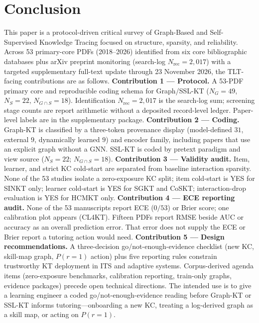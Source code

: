 \documentclass[lettersize,journal]{IEEEtran}
\begin{document}
\section{Conclusion}
\label{sec:conclusion}
This paper is a protocol-driven critical survey of Graph-Based and Self-Supervised Knowledge Tracing focused on structure, sparsity, and reliability. Across 53 primary-core PDFs (2018--2026) identified from six core bibliographic databases plus arXiv preprint monitoring (search-log $N_{\mathrm{rec}} = 2{,}017$) with a targeted supplementary full-text update through 23 November 2026, the TLT-facing contributions are as follows.
\textbf{Contribution 1 --- Protocol.} A 53-PDF primary core and reproducible coding schema for Graph/SSL-KT ($N_G=49$, $N_S=22$, $N_{G \cap S}=18$). Identification $N_{\mathrm{rec}}=2{,}017$ is the search-log sum; screening stage counts are report arithmetic without a deposited record-level ledger. Paper-level labels are in the supplementary package.
\textbf{Contribution 2 --- Coding.} Graph-KT is classified by a three-token provenance display (model-defined $31$, external $9$, dynamically learned $9$) and encoder family, including papers that use an explicit graph without a GNN. SSL-KT is coded by pretext paradigm and view source ($N_S=22$; $N_{G\cap S}=18$).
\textbf{Contribution 3 --- Validity audit.} Item, learner, and strict KC cold-start are separated from baseline interaction sparsity. None of the 53 studies isolate a zero-exposure KC split; item cold-start is YES for SINKT only; learner cold-start is YES for SGKT and CoSKT; interaction-drop evaluation is YES for HCMKT only.
\textbf{Contribution 4 --- ECE reporting audit.} None of the 53 manuscripts report ECE ($0/53$) or Brier score; one calibration plot appears (CL4KT). Fifteen PDFs report RMSE beside AUC or accuracy as an overall prediction error. That error does not supply the ECE or Brier report a tutoring action would need.
\textbf{Contribution 5 --- Design recommendations.} A three-decision go/not-enough-evidence checklist (new KC, skill-map graph, $P(r=1)$ action) plus five reporting rules constrain trustworthy KT deployment in ITS and adaptive systems. Corpus-derived agenda items (zero-exposure benchmarks, calibration reporting, train-only graphs, evidence packages) precede open technical directions.
The intended use is to give a learning engineer a coded go/not-enough-evidence reading before Graph-KT or SSL-KT informs tutoring---onboarding a new KC, treating a log-derived graph as a skill map, or acting on $P(r=1)$.
\appendices
\end{document}
